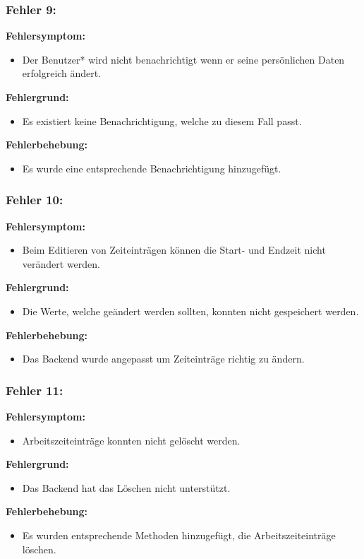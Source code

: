 \subsubsection{Fehler 9:}%
\textbf{Fehlersymptom:}
	\begin{itemize}
		\item Der Benutzer* wird nicht benachrichtigt wenn er seine persönlichen Daten erfolgreich ändert.
	\end{itemize}
\textbf{Fehlergrund:}
	\begin{itemize}
		\item Es existiert keine Benachrichtigung, welche zu diesem Fall passt.
	\end{itemize}
\textbf{Fehlerbehebung:}
	\begin{itemize}
		\item Es wurde eine entsprechende Benachrichtigung hinzugefügt.
	\end{itemize}

\subsubsection{Fehler 10:}%
\textbf{Fehlersymptom:}
	\begin{itemize}
		\item Beim Editieren von Zeiteinträgen können die Start- und Endzeit nicht verändert werden.
	\end{itemize}
\textbf{Fehlergrund:}
	\begin{itemize}
		\item Die Werte, welche geändert werden sollten, konnten nicht gespeichert werden.
	\end{itemize}
\textbf{Fehlerbehebung:}
	\begin{itemize}
		\item Das Backend wurde angepasst um Zeiteinträge richtig zu ändern.
	\end{itemize}

\subsubsection{Fehler 11:}%
\textbf{Fehlersymptom:}
	\begin{itemize}
		\item Arbeitszeiteinträge konnten nicht gelöscht werden.
	\end{itemize}
\textbf{Fehlergrund:}
	\begin{itemize}
		\item Das Backend hat das Löschen nicht unterstützt.
	\end{itemize}
\textbf{Fehlerbehebung:}
	\begin{itemize}
		\item Es wurden entsprechende Methoden hinzugefügt, die Arbeitszeiteinträge löschen.
	\end{itemize}

